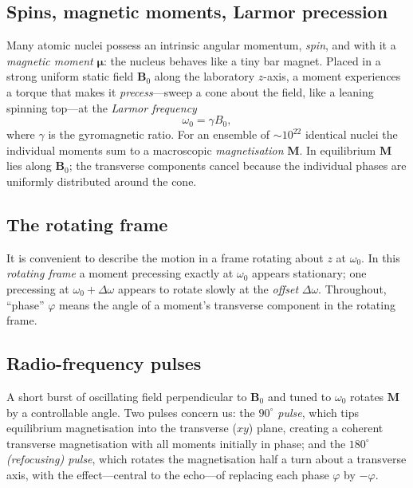 \documentclass[11pt,a4paper]{article}
\theoremstyle{thmstyle}
\theoremstyle{definition}
\theoremstyle{remark}
\newcommand{\Larmor}{\omega_{0}}
\begin{document}
\subsection{Spins, magnetic moments, Larmor precession}
\label{sec:larmor}

Many atomic nuclei possess an intrinsic angular momentum, \emph{spin},
and with it a \emph{magnetic moment} $\bm{\mu}$: the nucleus behaves like
a tiny bar magnet. Placed in a strong uniform static field $\bm{B}_0$
along the laboratory $z$-axis, a moment experiences a torque that makes
it \emph{precess}---sweep a cone about the field, like a leaning
spinning top---at the \emph{Larmor frequency}
\begin{equation}
\Larmor=\gamma B_{0},
\label{eq:larmor}
\end{equation}
where $\gamma$ is the gyromagnetic ratio. For an ensemble of $\sim
10^{22}$ identical nuclei the individual moments sum to a macroscopic
\emph{magnetisation} $\bm{M}$. In equilibrium $\bm{M}$ lies along
$\bm{B}_0$; the transverse components cancel because the individual
phases are uniformly distributed around the cone.

\subsection{The rotating frame}
\label{sec:rotating}

It is convenient to describe the motion in a frame rotating about $z$ at
$\Larmor$. In this \emph{rotating frame} a moment precessing exactly at
$\Larmor$ appears stationary; one precessing at $\Larmor+\Delta\omega$
appears to rotate slowly at the \emph{offset} $\Delta\omega$. Throughout,
``phase'' $\varphi$ means the angle of a moment's transverse component in
the rotating frame.

\subsection{Radio-frequency pulses}
\label{sec:rf}

A short burst of oscillating field perpendicular to $\bm{B}_0$ and tuned
to $\Larmor$ rotates $\bm{M}$ by a controllable angle. Two pulses
concern us: the \emph{$90^{\circ}$ pulse}, which tips equilibrium
magnetisation into the transverse ($xy$) plane, creating a coherent
transverse magnetisation with all moments initially in phase; and the
\emph{$180^{\circ}$ (refocusing) pulse}, which rotates the magnetisation
half a turn about a transverse axis, with the effect---central to the
echo---of replacing each phase $\varphi$ by $-\varphi$.
\end{document}
